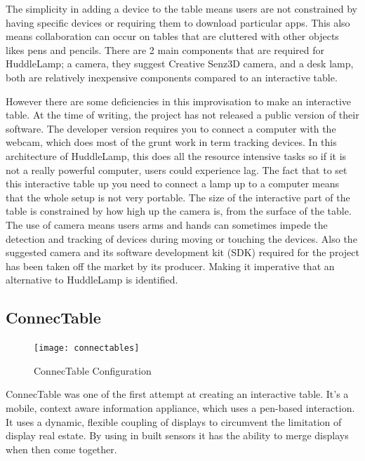The simplicity in adding a device to the table means users are not
constrained by having specific devices or requiring them to download
particular apps. This also means collaboration can occur on tables
that are cluttered with other objects likes pens and pencils. There
are 2 main components that are required for HuddleLamp;
a camera, they suggest Creative Senz3D camera, and a desk lamp, both
are relatively inexpensive components compared to an interactive table.

However there are some deficiencies in this improvisation to make
an interactive table. At the time of writing, the project has not
released a public version of their software. The developer
version requires you to connect a computer with the webcam, which
does most of the grunt work in term tracking devices. In this architecture
of HuddleLamp, this does all the resource intensive tasks so if it is
not a really powerful computer, users could experience lag. The fact
that to set this interactive table up you need to connect a lamp up
to a computer means that the whole setup is not very portable. The
size of the interactive part of the table is constrained by how high
up the camera is, from the surface of the table. The use of camera
means users arms and hands can sometimes impede the
detection and tracking of devices during moving or touching the devices.
Also the suggested camera and its software development kit (SDK) required
for the project has been taken off the market by its producer. Making
it imperative that an alternative to HuddleLamp is identified.


\subsection{ConnecTable}

\begin{figure}[H]
\texttt{[image: connectables]}

\protect\caption{ConnecTable Configuration}
\end{figure}


ConnecTable was one of the first attempt at creating an interactive
table. It\textquoteright s a mobile, context aware information appliance,
which uses a pen-based interaction. It uses a dynamic, flexible coupling
of displays to circumvent the limitation of display real estate. By
using in built sensors it has the ability to merge displays when then
come together. 


